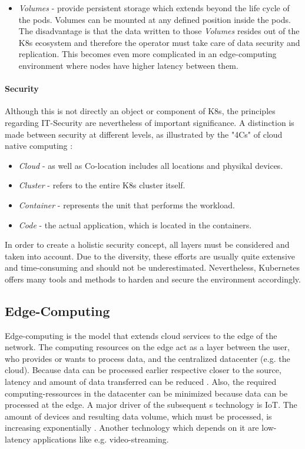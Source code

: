\documentclass[MSC,Master,english]{twbook}%
\begin{document}
\begin{itemize}
    \item \textit{Volumes} - provide persistent storage which extends beyond the life cycle of the pods. Volumes can be mounted at any defined position inside the pods. The disadvantage is that the data written to those \textit{Volumes} resides out of the \ac{K8s} ecosystem and therefore the operator must take care of data security and replication. This becomes even more complicated in an edge-computing environment where nodes have higher latency between them.
\end{itemize}

\paragraph{Security} Although this is not directly an object or component of \ac{K8s}, the principles regarding IT-Security are nevertheless of important significance. A distinction is made between security at different levels, as illustrated by the "4Cs" of cloud native computing \cite{k8s-4cs}:

\begin{itemize}
    \item \textit{Cloud} - as well as Co-location includes all locations and physikal devices.
    \item \textit{Cluster} - refers to the entire \ac{K8s} cluster itself.
    \item \textit{Container} - represents the unit that performs the workload.
    \item \textit{Code} - the actual application, which is located in the containers.
\end{itemize}

In order to create a holistic security concept, all layers must be considered and taken into account. Due to the diversity, these efforts are usually quite extensive and time-consuming  and should not be underestimated. Nevertheless, Kubernetes offers many tools and methods to harden and secure the environment accordingly.

\subsection{Edge-Computing}
Edge-computing is the model that extends cloud services to the edge of the
network. The computing resources on the edge act as a layer between the user, who provides or wants to process data, and the centralized datacenter (e.g. the cloud). Because data can be processed earlier respective closer to the source, latency and amount of data transferred can be reduced \cite{intro-edge}. Also, the required computing-ressources in the datacenter can be minimized because data can be processed at the edge. A major driver of the subsequent s technology is \ac{IoT}. The amount of devices and resulting data volume, which must be processed, is increasing exponentially \cite{SotE21}. Another technology which depends on it are low-latency applications like e.g. video-streaming. 
\end{document}
